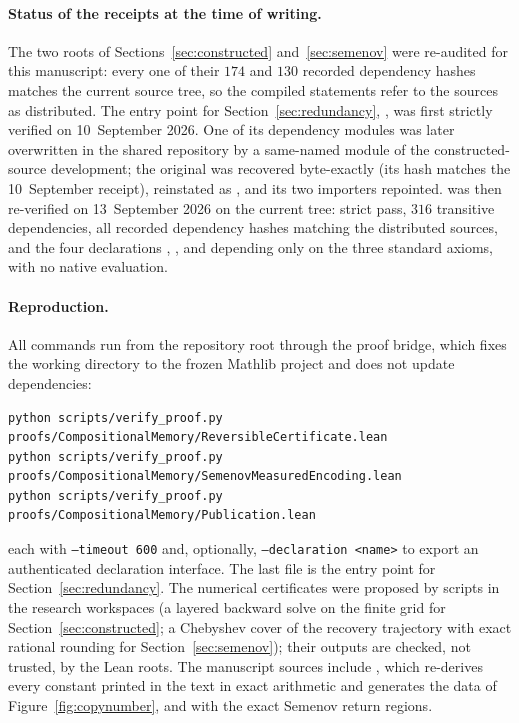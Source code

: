 \paragraph{Status of the receipts at the time of writing.}
The two roots of Sections~\ref{sec:constructed} and~\ref{sec:semenov} were re-audited for this manuscript: every one of their $174$ and $130$ recorded dependency hashes matches the current source tree, so the compiled statements refer to the sources as distributed. The entry point for Section~\ref{sec:redundancy}, , was first strictly verified on 10~September 2026. One of its dependency modules was later overwritten in the shared repository by a same-named module of the constructed-source development; the original was recovered byte-exactly (its hash matches the 10~September receipt), reinstated as , and its two importers repointed.  was then re-verified on 13~September 2026 on the current tree: strict pass, $316$ transitive dependencies, all recorded dependency hashes matching the distributed sources, and the four declarations , ,  and  depending only on the three standard axioms, with no native evaluation.

\paragraph{Reproduction.}
All commands run from the repository root through the proof bridge, which fixes the working directory to the frozen Mathlib project and does not update dependencies:
{\footnotesize\begin{verbatim}
python scripts/verify_proof.py proofs/CompositionalMemory/ReversibleCertificate.lean
python scripts/verify_proof.py proofs/CompositionalMemory/SemenovMeasuredEncoding.lean
python scripts/verify_proof.py proofs/CompositionalMemory/Publication.lean
\end{verbatim}}
each with \texttt{--timeout 600} and, optionally, \texttt{--declaration <name>} to export an authenticated declaration interface.
The last file is the entry point for Section~\ref{sec:redundancy}. The numerical certificates were proposed by scripts in the research workspaces (a layered backward solve on the finite grid for Section~\ref{sec:constructed}; a Chebyshev cover of the recovery trajectory with exact rational rounding for Section~\ref{sec:semenov}); their outputs are checked, not trusted, by the Lean roots. The manuscript sources include , which re-derives every constant printed in the text in exact arithmetic and generates the data of Figure~\ref{fig:copynumber}, and  with the exact Semenov return regions.
